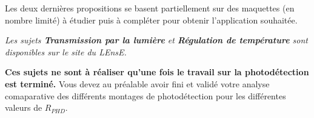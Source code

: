 \medskip

Les deux dernières propositions se basent partiellement sur des maquettes (en nombre limité) à étudier puis à compléter pour obtenir l'application souhaitée.

\bigskip

\textit{Les sujets \textbf{Transmission par la lumière} et \textbf{Régulation de température} sont disponibles sur le site du LEnsE.}

\bigskip

\textbf{Ces sujets ne sont à réaliser qu'une fois le travail sur la photodétection est terminé.} Vous devez au préalable avoir fini et validé votre analyse comaparative des différents montages de photodétection pour les différentes valeurs de $R_{PHD}$.




